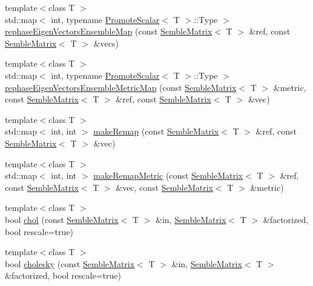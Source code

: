 \begin{DoxyCompactItemize}
\item 
{\footnotesize template$<$class T $>$ }\\std\+::map$<$ int, typename \mbox{\hyperlink{structSEMBLE_1_1PromoteScalar}{Promote\+Scalar}}$<$ T $>$\+::Type $>$ \mbox{\hyperlink{namespaceSEMBLE_aec7678ee7a5da493a6b088df20493a1f}{rephase\+Eigen\+Vectors\+Ensemble\+Map}} (const \mbox{\hyperlink{structSEMBLE_1_1SembleMatrix}{Semble\+Matrix}}$<$ T $>$ \&ref, const \mbox{\hyperlink{structSEMBLE_1_1SembleMatrix}{Semble\+Matrix}}$<$ T $>$ \&vecs)
\item 
{\footnotesize template$<$class T $>$ }\\std\+::map$<$ int, typename \mbox{\hyperlink{structSEMBLE_1_1PromoteScalar}{Promote\+Scalar}}$<$ T $>$\+::Type $>$ \mbox{\hyperlink{namespaceSEMBLE_a6720e329f02e8313f422d94b8a416230}{rephase\+Eigen\+Vectors\+Ensemble\+Metric\+Map}} (const \mbox{\hyperlink{structSEMBLE_1_1SembleMatrix}{Semble\+Matrix}}$<$ T $>$ \&metric, const \mbox{\hyperlink{structSEMBLE_1_1SembleMatrix}{Semble\+Matrix}}$<$ T $>$ \&ref, const \mbox{\hyperlink{structSEMBLE_1_1SembleMatrix}{Semble\+Matrix}}$<$ T $>$ \&vec)
\item 
{\footnotesize template$<$class T $>$ }\\std\+::map$<$ int, int $>$ \mbox{\hyperlink{namespaceSEMBLE_a7cb9cde2b51fb036476a01f5a37bf15c}{make\+Remap}} (const \mbox{\hyperlink{structSEMBLE_1_1SembleMatrix}{Semble\+Matrix}}$<$ T $>$ \&ref, const \mbox{\hyperlink{structSEMBLE_1_1SembleMatrix}{Semble\+Matrix}}$<$ T $>$ \&vec)
\item 
{\footnotesize template$<$class T $>$ }\\std\+::map$<$ int, int $>$ \mbox{\hyperlink{namespaceSEMBLE_a487d1e90c43dcb23f1d3eecb8f98376c}{make\+Remap\+Metric}} (const \mbox{\hyperlink{structSEMBLE_1_1SembleMatrix}{Semble\+Matrix}}$<$ T $>$ \&ref, const \mbox{\hyperlink{structSEMBLE_1_1SembleMatrix}{Semble\+Matrix}}$<$ T $>$ \&vec, const \mbox{\hyperlink{structSEMBLE_1_1SembleMatrix}{Semble\+Matrix}}$<$ T $>$ \&metric)
\item 
{\footnotesize template$<$class T $>$ }\\bool \mbox{\hyperlink{namespaceSEMBLE_af183367741f8d2609dd572702f7b4347}{chol}} (const \mbox{\hyperlink{structSEMBLE_1_1SembleMatrix}{Semble\+Matrix}}$<$ T $>$ \&in, \mbox{\hyperlink{structSEMBLE_1_1SembleMatrix}{Semble\+Matrix}}$<$ T $>$ \&factorized, bool rescale=true)
\item 
{\footnotesize template$<$class T $>$ }\\bool \mbox{\hyperlink{namespaceSEMBLE_affb96647c0e0a2b292f51ad740e92d78}{cholesky}} (const \mbox{\hyperlink{structSEMBLE_1_1SembleMatrix}{Semble\+Matrix}}$<$ T $>$ \&in, \mbox{\hyperlink{structSEMBLE_1_1SembleMatrix}{Semble\+Matrix}}$<$ T $>$ \&factorized, bool rescale=true)

\end{DoxyCompactItemize}

